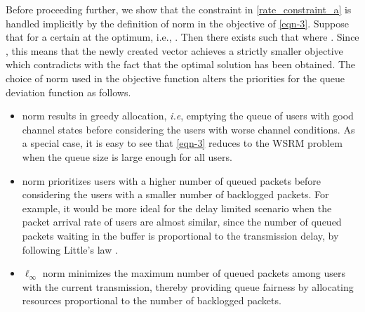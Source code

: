 Before proceeding further, we show that the constraint in \eqref{rate_constraint_a} is handled implicitly by the definition of  norm in the objective of \eqref{eqn-3}. Suppose that  for a certain  at the optimum, i.e., . Then there exists  such that  where . Since , this means that the newly created vector  achieves a strictly smaller objective which contradicts with the fact that the optimal solution has been obtained. The choice of  norm used in the objective function \cite{berry2004cross,qps_cioffi} alters the priorities for the queue deviation function as follows.
\begin{itemize}
\item {} norm results in greedy allocation, \textit{i.e}, emptying the queue of users with good channel states before considering the users with worse channel conditions. As a special case, it is easy to see that \eqref{eqn-3} reduces to the \ac{WSRM} problem when the queue size is large enough for all users.
\item {} norm prioritizes users with a higher number of queued packets before considering the users with a smaller number of backlogged packets. For example, it would be more ideal for the delay limited scenario when the packet arrival rate of users are almost similar, since the number of queued packets waiting in the buffer is proportional to the transmission delay, by following Little's law \cite{neely2010stochastic}.
\item \(\ell_{\infty} \) norm minimizes the maximum number of queued packets among users with the current transmission, thereby providing queue fairness by allocating resources proportional to the number of backlogged packets.
\end{itemize} 